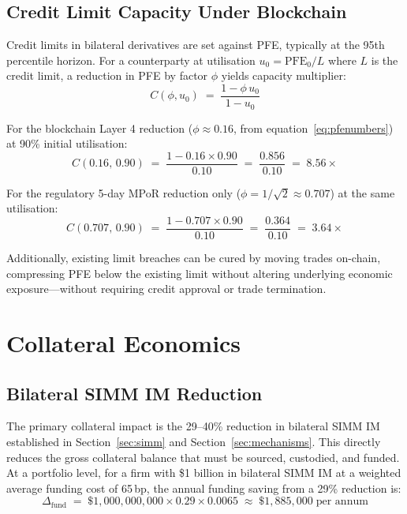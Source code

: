 \documentclass[12pt,letterpaper]{article}
\numberwithin{equation}{section}
\theoremstyle{remark}
\newcommand{\PFE}{\mathrm{PFE}}
\begin{document}
\subsection{Credit Limit Capacity Under Blockchain}

Credit limits in bilateral derivatives are set against PFE, typically at
the 95th percentile horizon. For a counterparty at utilisation $u_0 =
\PFE_0 / L$ where $L$ is the credit limit, a reduction in PFE by factor
$\phi$ yields capacity multiplier:
\begin{equation}
  C(\phi, u_0) \;=\; \frac{1 - \phi\, u_0}{1 - u_0}
  \label{eq:capacity}
\end{equation}

For the blockchain Layer 4 reduction ($\phi \approx 0.16$, from
equation~\ref{eq:pfenumbers}) at 90\% initial utilisation:
\begin{equation}
  C(0.16,\,0.90) \;=\;
  \frac{1 - 0.16 \times 0.90}{0.10} \;=\; \frac{0.856}{0.10} \;=\; 8.56\times
  \label{eq:capblockchain}
\end{equation}

For the regulatory 5-day MPoR reduction only ($\phi = 1/\sqrt{2}
\approx 0.707$) at the same utilisation:
\begin{equation}
  C(0.707,\,0.90) \;=\;
  \frac{1 - 0.707 \times 0.90}{0.10} \;=\; \frac{0.364}{0.10} \;=\; 3.64\times
  \label{eq:cap5day}
\end{equation}

Additionally, existing limit breaches can be cured by moving trades
on-chain, compressing PFE below the existing limit without altering
underlying economic exposure---without requiring credit approval or
trade termination.

\section{Collateral Economics}
\label{sec:collateral}

\subsection{Bilateral SIMM IM Reduction}

The primary collateral impact is the 29--40\% reduction in bilateral SIMM
IM established in Section~\ref{sec:simm} and Section~\ref{sec:mechanisms}.
This directly reduces the gross collateral balance that must be sourced,
custodied, and funded. At a portfolio level, for a firm with \$1 billion
in bilateral SIMM IM at a weighted average funding cost of 65\,bp, the
annual funding saving from a 29\% reduction is:
\begin{equation}
  \Delta_{\mathrm{fund}} \;=\; \$1{,}000{,}000{,}000 \times 0.29
  \times 0.0065 \;\approx\; \$1{,}885{,}000\;\text{per annum}
  \label{eq:imsaving}
\end{equation}
\end{document}
